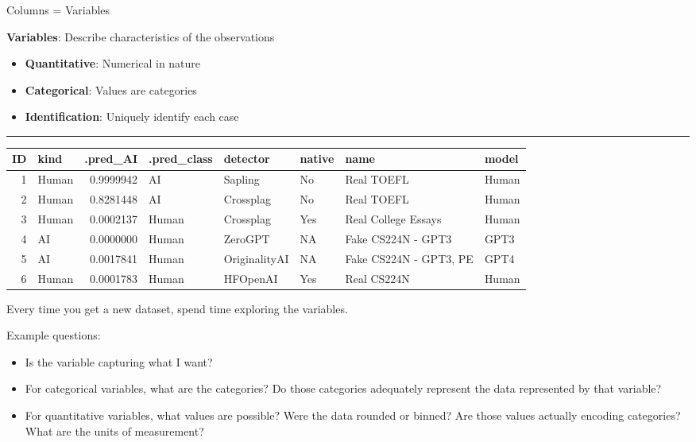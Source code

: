 \documentclass[
  letterpaper,
  DIV=11,
  numbers=noendperiod]{scrartcl}
\begin{document}
Columns = Variables

\textbf{Variables}: Describe characteristics of the observations

\begin{itemize}
\item
  \textbf{Quantitative}: Numerical in nature
\item
  \textbf{Categorical}: Values are categories
\item
  \textbf{Identification}: Uniquely identify each case
\end{itemize}

\begin{center}\rule{0.5\linewidth}{0.5pt}\end{center}

\begin{table}
\centering\begingroup\fontsize{32}{34}\selectfont

\begin{tabular}{r|l|r|l|l|l|l|l}
\hline
ID & kind & .pred\_AI & .pred\_class & detector & native & name & model\\
\hline
1 & Human & 0.9999942 & AI & Sapling & No & Real TOEFL & Human\\
\hline
2 & Human & 0.8281448 & AI & Crossplag & No & Real TOEFL & Human\\
\hline
3 & Human & 0.0002137 & Human & Crossplag & Yes & Real College Essays & Human\\
\hline
4 & AI & 0.0000000 & Human & ZeroGPT & NA & Fake CS224N - GPT3 & GPT3\\
\hline
5 & AI & 0.0017841 & Human & OriginalityAI & NA & Fake CS224N - GPT3, PE & GPT4\\
\hline
6 & Human & 0.0001783 & Human & HFOpenAI & Yes & Real CS224N & Human\\
\hline
\end{tabular}
\endgroup{}
\end{table}

Every time you get a new dataset, spend time exploring the variables.

Example questions:

\begin{itemize}
\item
  Is the variable capturing what I want?
\item
  For categorical variables, what are the categories? Do those
  categories adequately represent the data represented by that variable?
\item
  For quantitative variables, what values are possible? Were the data
  rounded or binned? Are those values actually encoding categories? What
  are the units of measurement?
\end{itemize}
\end{document}
